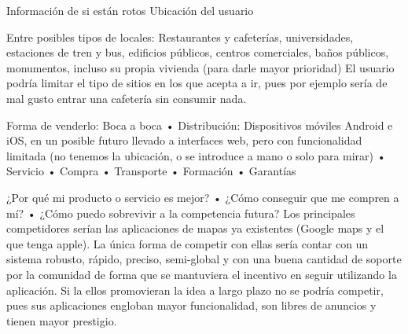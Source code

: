 \documentclass[13pt,a4paper]{article}
\begin{document}
Información de si están rotos
Ubicación del usuario

Entre posibles tipos de locales: Restaurantes y cafeterías, universidades, estaciones de tren y bus, edificios públicos, centros comerciales, baños públicos, monumentos, incluso su propia vivienda (para darle mayor prioridad)
El usuario podría limitar el tipo de sitios en los que acepta a ir, pues por ejemplo sería de mal gusto entrar una cafetería sin consumir nada.


Forma de venderlo: Boca a boca
• Distribución: Dispositivos móviles Android e iOS, en un posible futuro llevado a interfaces web, pero con funcionalidad limitada (no tenemos la ubicación, o se introduce a mano o solo para mirar)
• Servicio
• Compra
• Transporte
• Formación
• Garantías

¿Por qué mi producto o servicio es mejor?
• ¿Cómo conseguir que me compren a mí?
• ¿Cómo puedo sobrevivir a la competencia futura? Los principales competidores serían las aplicaciones de mapas ya existentes (Google maps y el que tenga apple). La única forma de competir con ellas sería contar con un sistema robusto, rápido, preciso, semi-global y con una buena cantidad de soporte por la comunidad de forma que se mantuviera el incentivo en seguir utilizando la aplicación. Si la ellos promovieran la idea a largo plazo no se podría competir, pues sus aplicaciones engloban mayor funcionalidad, son libres de anuncios y tienen mayor prestigio.


    \setlength{\parskip}{1em}
    \newpage
\end{document}
